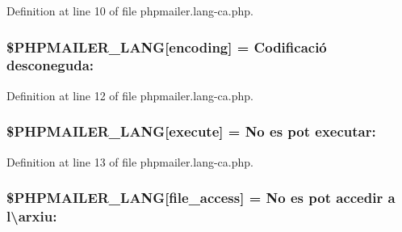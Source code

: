 Definition at line 10 of file phpmailer.\+lang-\/ca.\+php.

\subsubsection[{\texorpdfstring{\$\+P\+H\+P\+M\+A\+I\+L\+E\+R\+\_\+\+L\+A\+NG}{$PHPMAILER_LANG}}]{\setlength{\rightskip}{0pt plus 5cm}\$P\+H\+P\+M\+A\+I\+L\+E\+R\+\_\+\+L\+A\+NG\mbox{[}\textquotesingle{}encoding\textquotesingle{}\mbox{]} = \textquotesingle{}Codificació desconeguda\+: \textquotesingle{}}\hypertarget{phpmailer_8lang-ca_8php_a817f7283f3d54c970a0c10305cc668cc}{}\label{phpmailer_8lang-ca_8php_a817f7283f3d54c970a0c10305cc668cc}


Definition at line 12 of file phpmailer.\+lang-\/ca.\+php.

\subsubsection[{\texorpdfstring{\$\+P\+H\+P\+M\+A\+I\+L\+E\+R\+\_\+\+L\+A\+NG}{$PHPMAILER_LANG}}]{\setlength{\rightskip}{0pt plus 5cm}\$P\+H\+P\+M\+A\+I\+L\+E\+R\+\_\+\+L\+A\+NG\mbox{[}\textquotesingle{}execute\textquotesingle{}\mbox{]} = \textquotesingle{}No es pot executar\+: \textquotesingle{}}\hypertarget{phpmailer_8lang-ca_8php_a668217a9563a168f30f2a8548b6ed5a9}{}\label{phpmailer_8lang-ca_8php_a668217a9563a168f30f2a8548b6ed5a9}


Definition at line 13 of file phpmailer.\+lang-\/ca.\+php.

\subsubsection[{\texorpdfstring{\$\+P\+H\+P\+M\+A\+I\+L\+E\+R\+\_\+\+L\+A\+NG}{$PHPMAILER_LANG}}]{\setlength{\rightskip}{0pt plus 5cm}\$P\+H\+P\+M\+A\+I\+L\+E\+R\+\_\+\+L\+A\+NG\mbox{[}\textquotesingle{}file\+\_\+access\textquotesingle{}\mbox{]} = \textquotesingle{}No es pot accedir {\bf a} l\textbackslash{}\textquotesingle{}arxiu\+: \textquotesingle{}}\hypertarget{phpmailer_8lang-ca_8php_a7e83349023b856ef9e5c46e30ae6d51e}{}\label{phpmailer_8lang-ca_8php_a7e83349023b856ef9e5c46e30ae6d51e}


